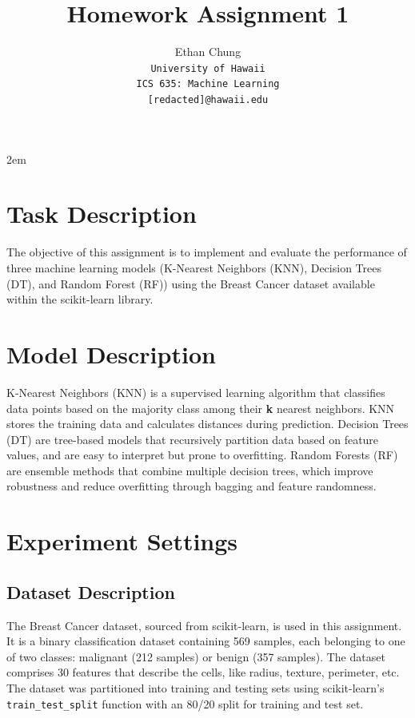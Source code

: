 \documentclass[letterpaper]{article}
\begin{document}
	\title{Homework Assignment 1}
	
	\author{Ethan Chung\\
		{\tt\small University of Hawaii}\\
		{\tt\small ICS 635: Machine Learning}\\
		{\tt\small [redacted]@hawaii.edu}}

	{\def\null\vskip 2em{}\maketitle}
	
	\section{Task Description}
	
		The objective of this assignment is to implement and evaluate the performance of three machine learning models (K-Nearest Neighbors (KNN), Decision Trees (DT), and Random Forest (RF)) using the Breast Cancer dataset available within the scikit-learn  library.
	
	\section{Model Description}
	
		K-Nearest Neighbors (KNN) is a supervised learning algorithm that classifies data points based on the majority class among their \textbf{k} nearest neighbors. KNN stores the training data and calculates distances during prediction. Decision Trees (DT) are tree-based models that recursively partition data based on feature values, and are easy to interpret but prone to overfitting. Random Forests (RF) are ensemble methods that combine multiple decision trees, which improve robustness and reduce overfitting through bagging and feature randomness.
	
	\section{Experiment Settings}
	
	\subsection{Dataset Description}
	
		The Breast Cancer dataset, sourced from scikit-learn, is used in this assignment.  It is a binary classification dataset containing 569 samples, each belonging to one of two classes: malignant (212 samples) or benign (357 samples). The dataset comprises 30 features that describe the cells, like radius, texture, perimeter, etc. The dataset was partitioned into training and testing sets using scikit-learn's \texttt{train\_test\_split} function with an 80/20 split for training and test set.
	
\end{document}
